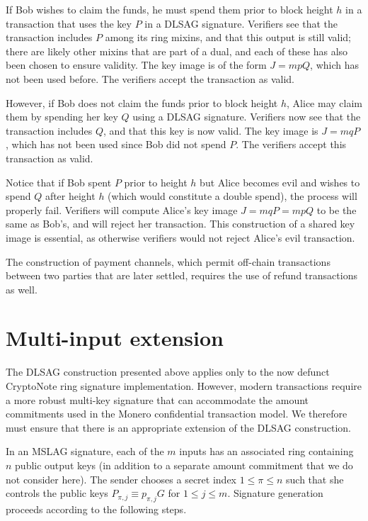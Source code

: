 \documentclass{mrl}
\begin{document}
If Bob wishes to claim the funds, he must spend them prior to block height $h$ in a transaction that uses the key $P$ in a DLSAG signature. Verifiers see that the transaction includes $P$ among its ring mixins, and that this output is still valid; there are likely other mixins that are part of a dual, and each of these has also been chosen to ensure validity. The key image is of the form $J = mpQ$, which has not been used before. The verifiers accept the transaction as valid.

However, if Bob does not claim the funds prior to block height $h$, Alice may claim them by spending her key $Q$ using a DLSAG signature. Verifiers now see that the transaction includes $Q$, and that this key is now valid. The key image is $J = mqP$, which has not been used since Bob did not spend $P$. The verifiers accept this transaction as valid.

Notice that if Bob spent $P$ prior to height $h$ but Alice becomes evil and wishes to spend $Q$ after height $h$ (which would constitute a double spend), the process will properly fail. Verifiers will compute Alice's key image $J = mqP = mpQ$ to be the same as Bob's, and will reject her transaction. This construction of a shared key image is essential, as otherwise verifiers would not reject Alice's evil transaction.

The construction of payment channels, which permit off-chain transactions between two parties that are later settled, requires the use of refund transactions as well.

\section{Multi-input extension}
The DLSAG construction presented above applies only to the now defunct CryptoNote ring signature implementation. However, modern transactions require a more robust multi-key signature that can accommodate the amount commitments used in the Monero confidential transaction model. We therefore must ensure that there is an appropriate extension of the DLSAG construction.

In an MSLAG signature, each of the $m$ inputs has an associated ring containing $n$ public output keys (in addition to a separate amount commitment that we do not consider here). The sender chooses a secret index $1 \leq \pi \leq n$ such that she controls the public keys $P_{\pi,j} \equiv p_{\pi,j}G$ for $1 \leq j \leq m$. Signature generation proceeds according to the following steps.
\end{document}
